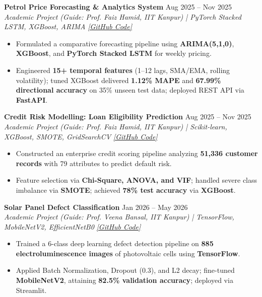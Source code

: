 \documentclass[10pt]{article}
\begin{document}
\vspace{1.5pt}

\textbf{Petrol Price Forecasting \& Analytics System} \hfill Aug 2025 -- Nov 2025\\
\textit{Academic Project (Guide: Prof. Faiz Hamid, IIT Kanpur) | PyTorch Stacked LSTM, XGBoost, ARIMA} \hfill \href{https://github.com/Ankitiitk369/Petrol-Price-Forecasting-Analytics-System}{\textit{[GitHub Code]}}
\begin{itemize}[noitemsep, topsep=1pt, partopsep=0pt, parsep=0.5pt]
    \item Formulated a comparative forecasting pipeline using \textbf{ARIMA(5,1,0)}, \textbf{XGBoost}, and \textbf{PyTorch Stacked LSTM} for weekly pricing.
    \item Engineered \textbf{15+ temporal features} (1--12 lags, SMA/EMA, rolling volatility); tuned XGBoost delivered \textbf{1.12\% MAPE} and \textbf{67.99\% directional accuracy} on 35\% unseen test data; deployed REST API via \textbf{FastAPI}.
\end{itemize}

\vspace{1.5pt}

\textbf{Credit Risk Modelling: Loan Eligibility Prediction} \hfill Aug 2025 -- Nov 2025\\
\textit{Academic Project (Guide: Prof. Faiz Hamid, IIT Kanpur) | Scikit-learn, XGBoost, SMOTE, GridSearchCV} \hfill \href{https://github.com/Ankitiitk369/Credit-Risk-Modelling-Loan-Eligibility-Prediction}{\textit{[GitHub Code]}}
\begin{itemize}[noitemsep, topsep=1pt, partopsep=0pt, parsep=0.5pt]
    \item Constructed an enterprise credit scoring pipeline analyzing \textbf{51,336 customer records} with 79 attributes to predict default risk.
    \item Feature selection via \textbf{Chi-Square, ANOVA, and VIF}; handled severe class imbalance via \textbf{SMOTE}; achieved \textbf{78\% test accuracy} via \textbf{XGBoost}.
\end{itemize}

\vspace{1.5pt}

\textbf{Solar Panel Defect Classification} \hfill Jan 2026 -- May 2026\\
\textit{Academic Project (Guide: Prof. Veena Bansal, IIT Kanpur) | TensorFlow, MobileNetV2, EfficientNetB0} \hfill \href{https://github.com/Ankitiitk369/Solar-panel-image-classification-Using-CNN-And-Pretrained-model}{\textit{[GitHub Code]}}
\begin{itemize}[noitemsep, topsep=1pt, partopsep=0pt, parsep=0.5pt]
    \item Trained a 6-class deep learning defect detection pipeline on \textbf{885 electroluminescence images} of photovoltaic cells using \textbf{TensorFlow}.
    \item Applied Batch Normalization, Dropout (0.3), and L2 decay; fine-tuned \textbf{MobileNetV2}, attaining \textbf{82.5\% validation accuracy}; deployed via Streamlit.
\end{itemize}
\end{document}
